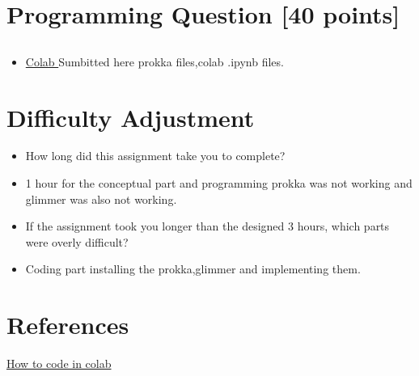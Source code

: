 \documentclass{article}
\begin{document}
\section{Programming Question [40 points]}

\subsection{}

\begin{itemize}
 \item 
 \href{https://colab.research.google.com/drive/126oLyC6VqOoYHRCdmnvoMUFkoeYL4Y73#scrollTo=lrZwiNMw2SRr&uniqifier=2}{Colab }
 \newline Sumbitted here 
 prokka files,colab .ipynb files. 
\end{itemize}

\section{Difficulty Adjustment}
\begin{itemize}
    \item How long did this assignment take you to complete? 
    \item 1 hour for the conceptual part and programming prokka was not working and glimmer was also not working.
    \item If the assignment took you longer than the designed 3 hours, which parts were overly difficult? 
    \item Coding part installing the prokka,glimmer and implementing them.
\end{itemize}

\section{References}
\begin{itemize}
\href{https://rjai.me/posts/google-colab-conda/}{How to code in colab}
\end{itemize}
\end{document}
